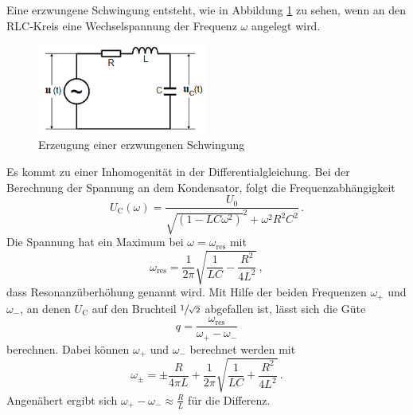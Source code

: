 Eine erzwungene Schwingung entsteht, wie in Abbildung \ref{fig:erzw} zu sehen, wenn an den RLC-Kreis eine Wechselspannung der Frequenz $\omega$ angelegt wird.
\begin{figure}
    \centering
    \caption{Erzeugung einer erzwungenen Schwingung \cite{}} 
    \label{fig:erzw}
    \includegraphics[width = 0.5\textwidth]{pics/Erzwungen.png}
\end{figure}
Es kommt zu einer Inhomogenität in der 
Differentialgleichung. Bei der Berechnung der Spannung an dem Kondensator, folgt die Frequenzabhängigkeit
\begin{equation}
    U_\text{C}(\omega)= \frac{U_0}{\sqrt{\left(1-LC\omega^2\right)}^2 + \omega^2 R^2 C^2} \, .
    \label{eqn:frqnzabhängi}
\end{equation}
Die Spannung hat ein Maximum bei $\omega=\omega_\text{res}$ mit 
\begin{equation}
    \omega_\text{res}= \frac{1}{2 \pi} \sqrt{\frac{1}{L C} - \frac{R^2}{4 L^2}} \, ,
    \label{eqn:omgres}
\end{equation}
dass Resonanzüberhöhung genannt wird. Mit Hilfe der beiden Frequenzen $\omega_+$ und $\omega_-$, an denen $U_\text{C}$ auf den Bruchteil $\sfrac{1}{\sqrt{2}}$
abgefallen ist, lässt sich die Güte 
\begin{equation}
    q=\frac{\omega_\text{res}}{\omega_+ - \omega_-}
    \label{eqn:güte}
\end{equation}
berechnen. Dabei können $\omega_+$ und $\omega_-$ berechnet werden mit
\begin{equation}
    \omega_\pm= \pm \frac{R}{4 \pi L} + \frac{1}{2\pi} \sqrt{\frac{1}{L C} + \frac{R^2}{4 L^2}} \, .
    \label{eqn:omgapm}
\end{equation}
Angenähert ergibt sich $\omega_+ - \omega_- \approx \frac{R}{L}$ für die Differenz.